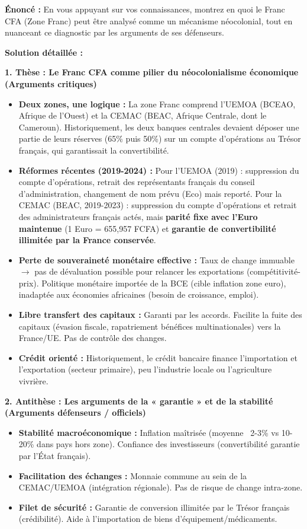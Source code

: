 \documentclass[11pt]{article}
\newcommand{\cle}[1]{{\popxbold\color{popdark}#1}}
\begin{document}
\begin{exoresolu}
\textbf{Énoncé :} En vous appuyant sur vos connaissances, montrez en quoi le Franc CFA (Zone Franc) peut être analysé comme un mécanisme néocolonial, tout en nuanceant ce diagnostic par les arguments de ses défenseurs.

\tcblower
\textbf{Solution détaillée :}

\textbf{1. Thèse : Le Franc CFA comme pilier du néocolonialisme économique (Arguments critiques)}
\begin{itemize}
    \item \textbf{Deux zones, une logique :} La zone Franc comprend l'\cle{UEMOA} (BCEAO, Afrique de l'Ouest) et la \cle{CEMAC} (BEAC, Afrique Centrale, dont le Cameroun). Historiquement, les deux banques centrales devaient déposer une partie de leurs réserves (65\% puis 50\%) sur un \cle{compte d'opérations} au \cle{Trésor français}, qui garantissait la convertibilité.
    \item \textbf{Réformes récentes (2019-2024) :} Pour l'UEMOA (2019) : suppression du compte d'opérations, retrait des représentants français du conseil d'administration, changement de nom prévu (Eco) mais reporté. Pour la CEMAC (BEAC, 2019-2023) : suppression du compte d'opérations et retrait des administrateurs français actés, mais \textbf{parité fixe avec l'Euro maintenue} (1 Euro = 655,957 FCFA) et \textbf{garantie de convertibilité illimitée par la France conservée}.
    \item \textbf{Perte de souveraineté monétaire effective :} Taux de change immuable $\to$ pas de dévaluation possible pour relancer les exportations (compétitivité-prix). Politique monétaire importée de la BCE (cible inflation zone euro), inadaptée aux économies africaines (besoin de croissance, emploi).
    \item \textbf{Libre transfert des capitaux :} Garanti par les accords. Facilite la \cle{fuite des capitaux} (évasion fiscale, rapatriement bénéfices multinationales) vers la France/UE. Pas de contrôle des changes.
    \item \textbf{Crédit orienté :} Historiquement, le crédit bancaire finance l'importation et l'exportation (secteur primaire), peu l'industrie locale ou l'agriculture vivrière.
\end{itemize}

\textbf{2. Antithèse : Les arguments de la « garantie » et de la stabilité (Arguments défenseurs / officiels)}
\begin{itemize}
    \item \textbf{Stabilité macroéconomique :} Inflation maîtrisée (moyenne ~2-3\% vs 10-20\% dans pays hors zone). Confiance des investisseurs (convertibilité garantie par l'État français).
    \item \textbf{Facilitation des échanges :} Monnaie commune au sein de la CEMAC/UEMOA (intégration régionale). Pas de risque de change intra-zone.
    \item \textbf{Filet de sécurité :} Garantie de conversion illimitée par le Trésor français (crédibilité). Aide à l'importation de biens d'équipement/médicaments.
\end{itemize}


\end{exoresolu}
\end{document}
